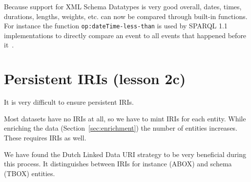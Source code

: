 \documentclass[a4paper]{scrartcl}
\newcommand{\textt}[1]{{\small \texttt{#1}}}
\begin{document}
Because support for XML Schema Datatypes is very good overall, dates,
times, durations, lengths, weights, etc. can now be compared through
built-in functions.  For instance the function
\textt{op:dateTime-less-than} is used by SPARQL 1.1 implementations to
directly compare an event to all events that happened before
it~\cite{Malhotra2015}.



\section{Persistent IRIs (lesson 2c)}

It is very difficult to ensure persistent IRIs.

Most datasets have no IRIs at all, so we have to mint IRIs for each
entity.  While enriching the data (Section~\ref{sec:enrichment}) the
number of entities increases.  These requires IRIs as well.

We have found the Dutch Linked Data URI strategy to be very beneficial
during this process.  It distinguishes between IRIs for instance
(ABOX) and schema (TBOX) entities.

\end{document}
